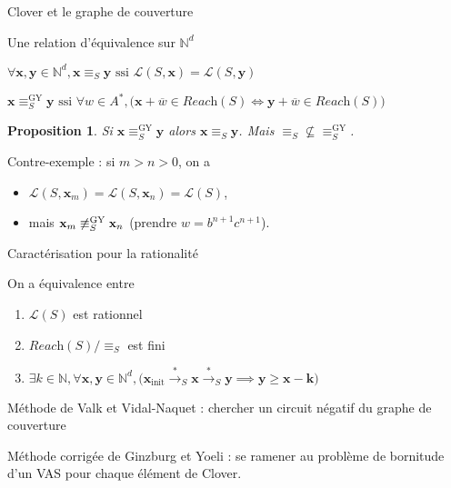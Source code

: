 \documentclass[french]{beamer}
\newcommand{\N}{\ensuremath{\mathbb{N}}}
\newcommand{\lang}{\ensuremath{\mathcal{L}}}
\newcommand{\reach}{\ensuremath{\textit{Reach}}}
\newcommand{\trans}[2]{\ensuremath{\stackrel{#1}{\longrightarrow}_{#2}}}
\newcommand{\vect}[1]{\ensuremath{\mathbf{#1}}}
\newcommand{\rel}{\ensuremath{\equiv}}
\newcommand{\relGY}{\ensuremath{\equiv^\text{GY}_S}}
\newcommand{\ssi}{\ensuremath{\text{ ssi }}}
\newcommand{\equivaut}{\ensuremath{\Leftrightarrow}}
\newcommand{\xinit}{\ensuremath{\vect{x}_\text{init}}}
\newcommand{\valeur}[1]{\ensuremath{\overline{#1}}}
\newtheorem{proposition}{Proposition}
\begin{document}
\begin{frame}{Clover et le graphe de couverture}
    
\end{frame}

\begin{frame}{Une relation d'équivalence sur $\N^d$}
\begin{definition} 
$\forall \vect{x},\vect{y}\in\N^d, \vect{x} \rel_S \vect{y} \ssi \lang(S,\vect{x}) = \lang(S,\vect{y})$
\end{definition}

\begin{definition} 
$\vect{x}\relGY\vect{y} \ssi \forall w\in A^\ast, \big( \vect{x} +\valeur{w}\in\reach(S) \equivaut \vect{y} +\valeur{w}\in\reach(S) \big)$
\end{definition}

\begin{proposition}
Si $\vect{x} \relGY \vect{y}$ alors $\vect{x} \rel_S \vect{y}$.
Mais $\rel_S \not\subseteq \relGY$.
\end{proposition}

Contre-exemple : 
si $m>n>0$, on a 
\begin{itemize}
    \item $\lang(S,\vect{x}_m) =\lang(S,\vect{x}_n) =\lang(S)$,
    \item mais $\vect{x}_m \not\relGY \vect{x}_n$ (prendre $w= b^{n+1}c^{n+1}$).
\end{itemize}
\end{frame}


\begin{frame}{Caractérisation pour la rationalité}
\begin{theorem}
On a équivalence entre
\begin{enumerate}
    \item $\lang(S)$ est rationnel
    \item $\reach(S)/\rel_S$ est fini
    \item $\exists k\in\N, \forall \vect{x},\vect{y}\in\N^d, 
\big( \xinit\trans{*}{S} \vect{x} \trans{*}{S} \vect{y}\implies
\vect{y}\geq \vect{x} -\vect{k} \big)$
\end{enumerate}
\end{theorem}

\vspace{3mm}
Méthode de Valk et Vidal-Naquet : 
chercher un circuit négatif du graphe de couverture

Méthode corrigée de Ginzburg et Yoeli :
se ramener au problème de bornitude d'un VAS pour chaque élément de Clover. 
\end{frame}
\end{document}
